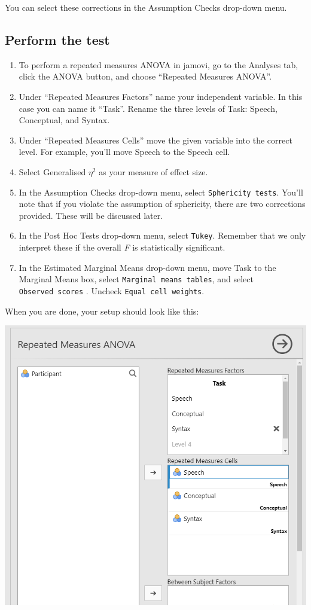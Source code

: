 \documentclass[
]{book}
\begin{document}
You can select these corrections in the Assumption Checks drop-down menu.

\hypertarget{perform-the-test-7}{%
\subsection{Perform the test}\label{perform-the-test-7}}

\begin{enumerate}
\def\labelenumi{\arabic{enumi}.}
\item
  To perform a repeated measures ANOVA in jamovi, go to the Analyses tab, click the ANOVA button, and choose ``Repeated Measures ANOVA''.
\item
  Under ``Repeated Measures Factors'' name your independent variable. In this case you can name it ``Task''. Rename the three levels of Task: Speech, Conceptual, and Syntax.
\item
  Under ``Repeated Measures Cells'' move the given variable into the correct level. For example, you'll move Speech to the Speech cell.
\item
  Select Generalised \(\eta^2\) as your measure of effect size.
\item
  In the Assumption Checks drop-down menu, select \texttt{Sphericity\ tests}. You'll note that if you violate the assumption of sphericity, there are two corrections provided. These will be discussed later.
\item
  In the Post Hoc Tests drop-down menu, select \texttt{Tukey}. Remember that we only interpret these if the overall \emph{F} is statistically significant.
\item
  In the Estimated Marginal Means drop-down menu, move Task to the Marginal Means box, select \texttt{Marginal\ means\ tables}, and select \texttt{Observed\ scores} . Uncheck \texttt{Equal\ cell\ weights}.
\end{enumerate}

When you are done, your setup should look like this:

\includegraphics{images/05-repeated-measures-anova/rm-anova_setup1.png}
\end{document}
